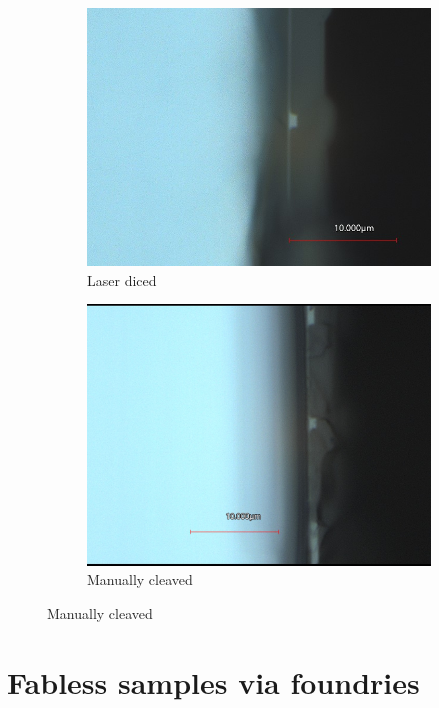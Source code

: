 \begin{figure}
    \centering
	\begin{subfigure}[b]{0.45\textwidth}
		\includegraphics[width=\textwidth]{imgs/jpg/laser}
 		\caption{Laser diced}
	\end{subfigure}
	\begin{subfigure}[b]{0.45\textwidth}
		\includegraphics[width=\textwidth]{imgs/jpg/manual_cleav}
 		\caption{Manually cleaved}
	\end{subfigure}
    \label{fig:dicing}
\end{figure}

\section{Fabless samples via foundries}

